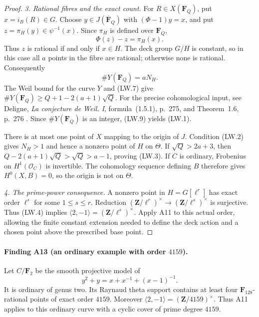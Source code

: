 \begin{proof}
\emph{3. Rational fibres and the exact count.}
For $R\in X(\mathbf F_Q)$, put $x=i_B(R)\in G$.
Choose $y\in J(\overline{\mathbf F}_Q)$ with
$(\Phi-1)y=x$, and put $z=\pi_H(y)\in\psi^{-1}(x)$.
Since $\pi_H$ is defined over $\mathbf F_Q$,
\[
                 \Phi(z)-z=\pi_H(x).
 \tag{LW.8}
\]
Thus $z$ is rational if and only if $x\in H$.
The deck group $G/H$ is constant, so in this case all $a$ points
in the fibre are rational; otherwise none is rational.
Consequently
\[
                           \#Y(\mathbf F_Q)=aN_H.
 \tag{LW.9}
\]
The Weil bound for the curve $Y$ and (LW.7) give
$\#Y(\mathbf F_Q)\ge Q+1-2(a+1)\sqrt Q$.
For the precise cohomological input, see Deligne,
\emph{La conjecture de Weil. I}, formula~(1.5.1), p.~275, and
Theorem~1.6, p.~276 \cite{WeilI}.  Since $\#Y(\mathbf F_Q)$ is an integer,
(LW.9) yields (LW.1).

There is at most one point of $X$ mapping to the origin of $J$.
Condition (LW.2) gives $N_H>1$ and hence a nonzero point of $H$ on
$\Theta$.  If $\sqrt Q>2a+3$, then
$Q-2(a+1)\sqrt Q>\sqrt Q>a-1$, proving (LW.3).
If $C$ is ordinary, Frobenius on $H^1(\mathcal O_C)$ is invertible.
The cohomology sequence defining $B$ therefore gives
$H^0(X,B)=0$, so the origin is not on $\Theta$.

\emph{4. The prime-power consequence.}
A nonzero point in $H=G[\ell^r]$ has exact order $\ell^s$ for some
$1\le s\le r$.  Reduction
$(\mathbf Z/\ell^r)^\times\to(\mathbf Z/\ell^s)^\times$ is surjective.
Thus (LW.4) implies
$\langle2,-1\rangle=(\mathbf Z/\ell^s)^\times$.
Apply A11 to this actual order, allowing the finite constant
extension needed to define the deck action and a chosen point
above the prescribed base point.
\end{proof}

\paragraph{Finding A13 (an ordinary example with order $4159$).}
Let $C/\mathbf F_2$ be the smooth projective model of
\[
                  y^2+y=x+x^{-1}+(x-1)^{-1}.
 \tag{LW.10}
\]
It is ordinary of genus two.  Its Raynaud theta support contains
at least four $\mathbf F_{128}$-rational points of exact order
$4159$.  Moreover
$\langle2,-1\rangle=(\mathbf Z/4159)^\times$.
Thus A11 applies to this ordinary curve with a cyclic cover of
prime degree $4159$.

